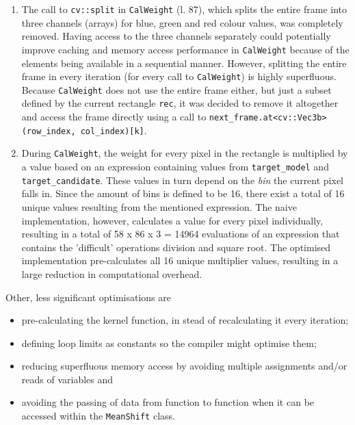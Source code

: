 \documentclass[final]{article}
\begin{document}
\begin{enumerate}
    \item The call to \texttt{cv::split} in \texttt{CalWeight} (l. 87), which splits the entire frame into three channels (arrays) for blue, green and red colour values, was completely removed.
    Having access to the three channels separately could potentially improve caching and memory access performance in \texttt{CalWeight} because of the elements being available in a sequential manner.
    However, splitting the entire frame in every iteration (for every call to \texttt{CalWeight}) is highly superfluous.
    Because \texttt{CalWeight} does not use the entire frame either, but just a subset defined by the current rectangle \texttt{rec}, it was decided to remove it altogether and access the frame directly using a call to \texttt{next\_frame.at<cv::Vec3b>(row\_index, col\_index)[k]}.

    \item During \texttt{CalWeight}, the weight for every pixel in the rectangle is multiplied by a value based on an expression containing values from \texttt{target\_model} and \texttt{target\_candidate}.
    These values in turn depend on the \emph{bin} the current pixel falls in.
    Since the amount of bins is defined to be 16, there exist a total of 16 unique values resulting from the mentioned expression.
    The naive implementation, however, calculates a value for every pixel individually, resulting in a total of 58 x 86 x 3 = 14964 evaluations of an expression that contains the 'difficult' operations division and square root.
    The optimised implementation pre-calculates all 16 unique multiplier values, resulting in a large reduction in computational overhead.
\end{enumerate}

Other, less significant optimisations are
\begin{itemize}
     \item pre-calculating the kernel function, in stead of recalculating it every iteration;
     \item defining loop limits as constants so the compiler might optimise them;
     \item reducing superfluous memory access by avoiding multiple assignments and/or reads of variables and
     \item avoiding the passing of data from function to function when it can be accessed within the \texttt{MeanShift} class.
\end{itemize}
\end{document}
